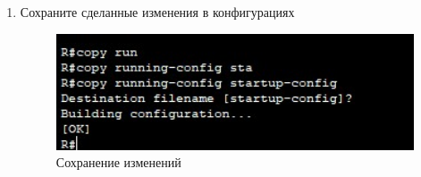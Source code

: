 \documentclass[bachelor, och, labwork]{shiza}
\begin{document}
\begin{enumerate}
        \item Сохраните сделанные изменения в конфигурациях
        
        \begin{figure}[H]
            \centering      %
            \includegraphics[width=1\textwidth]{18}
            \caption{Сохранение изменений}
            \label{fig:image1}
        \end{figure}


\end{enumerate}
\end{document}

